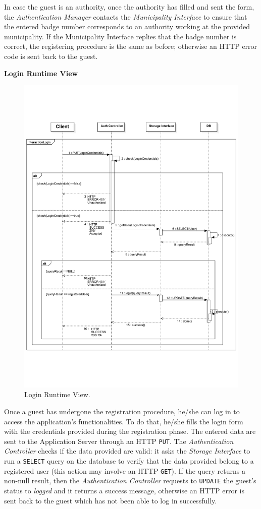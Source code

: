 \documentclass{report}
\begin{document}
In case the guest is an authority, once the authority has filled and sent the form, the \textit{Authentication Manager} contacts the \textit{Municipality Interface} to ensure that the entered badge number corresponds to an authority working at the provided municipality. If the Municipality Interface replies that the badge number is correct, the registering procedure is the same as before; otherwise an HTTP error code is sent back to the guest.    
\clearpage
\begin{center}\large{\textbf{Login Runtime View}}\end{center}
\begin{figure}[H]
	\begin{center}
	\includegraphics[width=.9\textwidth]{img/Loginn.pdf}
    \end{center}
    \label{fig:LoginSD}
	\caption{Login Runtime View.}
\end{figure}
Once a guest has undergone the registration procedure, he/she can log in to access the application's functionalities. To do that, he/she fills the login form with the credentials provided during the registration phase. The entered data are sent to the Application Server through an HTTP \texttt{PUT}. The \textit{Authentication Controller} checks if the data provided are valid: it asks the \textit{Storage Interface} to run a \texttt{SELECT} query on the database to verify that the data provided belong to a registered user (this action may involve an HTTP \texttt{GET}). If the query returns a non-null result, then the \textit{Authentication Controller} requests to \texttt{UPDATE} the guest's status to \textit{logged} and it returns a success message, otherwise an HTTP error is sent back to the guest which has not been able to log in successfully.
\end{document}
